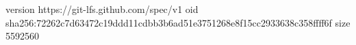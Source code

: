 version https://git-lfs.github.com/spec/v1
oid sha256:72262c7d63472c19ddd11cdbb3b6ad51e3751268e8f15cc2933638c358ffff6f
size 5592560

